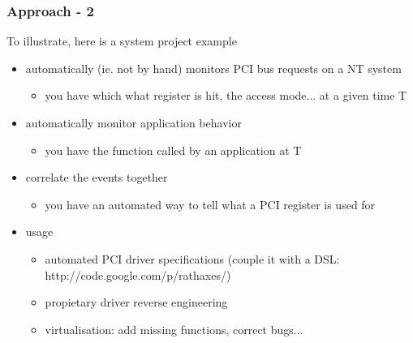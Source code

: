 \begin{frame}
  \frametitle{Approach - 2}
  To illustrate, here is a system project example
  \begin{itemize}
  \item
    automatically (ie. not by hand) monitors PCI bus requests on a NT system
    \begin{itemize} \item you have which what register is hit, the access mode... at a given time T \end{itemize}
  \item
    automatically monitor application behavior
    \begin{itemize} \item you have the function called by an application at T \end{itemize}
  \item
    correlate the events together
    \begin{itemize} \item you have an automated way to tell what a PCI register is used for \end{itemize}
  \item
    usage
    \begin{itemize}
      \item automated PCI driver specifications (couple it with a DSL: http://code.google.com/p/rathaxes/)
      \item propietary driver reverse engineering
      \item virtualisation: add missing functions, correct bugs...
    \end{itemize}
  \end{itemize}
\end{frame}


